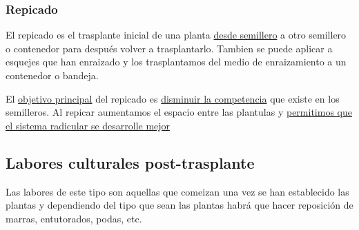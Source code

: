 \documentclass[a4paper,12pt,oneside]{article}
\begin{document}
\subsubsection{Repicado}
\label{sec:org0014b8e}
El repicado es el trasplante inicial de una planta \uline{desde semillero} a otro
semillero o contenedor para después volver a trasplantarlo. Tambien se puede
aplicar a esquejes que han enraizado y los trasplantamos del medio de
enraizamiento a un contenedor o bandeja.

El \uline{objetivo principal} del repicado es \uline{disminuir la competencia} que existe en
los semilleros. Al repicar aumentamos el espacio entre las plantulas y
\uline{permitimos que el sistema radicular se desarrolle mejor}

\subsection{Labores culturales post-trasplante}
\label{sec:org82e0fd9}
Las labores de este tipo son aquellas que comeizan una vez se han establecido
las plantas y dependiendo del tipo que sean las plantas habrá que hacer
reposición de marras, entutorados, podas, etc. 
\end{document}
